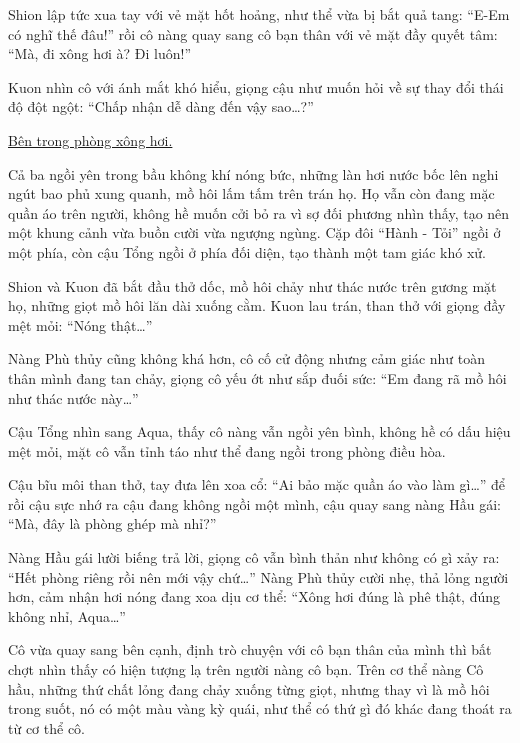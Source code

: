 \documentclass[../main.tex]{subfiles}
\begin{document}
Shion lập tức xua tay với vẻ mặt hốt hoảng, như thể vừa bị bắt quả tang: ``E-Em có nghĩ thế đâu!'' rồi cô nàng quay sang cô bạn thân với vẻ mặt đầy quyết tâm: ``Mà, đi xông hơi à? Đi luôn!''

Kuon nhìn cô với ánh mắt khó hiểu, giọng cậu như muốn hỏi về sự thay đổi thái độ đột ngột: ``Chấp nhận dễ dàng đến vậy sao\dots?''

\begin{center}
  \uline{Bên trong phòng xông hơi.}
\end{center}

Cả ba ngồi yên trong bầu không khí nóng bức, những làn hơi nước bốc lên nghi ngút bao phủ xung quanh, mồ hôi lấm tấm trên trán họ. Họ vẫn còn đang mặc quần áo trên người, không hề muốn cởi bỏ ra vì sợ đối phương nhìn thấy, tạo nên một khung cảnh vừa buồn cười vừa ngượng ngùng. Cặp đôi ``Hành - Tỏi'' ngồi ở một phía, còn cậu Tổng ngồi ở phía đối diện, tạo thành một tam giác khó xử.


Shion và Kuon đã bắt đầu thở dốc, mồ hôi chảy như thác nước trên gương mặt họ, những giọt mồ hôi lăn dài xuống cằm. Kuon lau trán, than thở với giọng đầy mệt mỏi: ``Nóng thật\dots''

Nàng Phù thủy cũng không khá hơn, cô cố cử động nhưng cảm giác như toàn thân mình đang tan chảy, giọng cô yếu ớt như sắp đuối sức: ``Em đang rã mồ hôi như thác nước này\dots''

Cậu Tổng nhìn sang Aqua, thấy cô nàng vẫn ngồi yên bình, không hề có dấu hiệu mệt mỏi, mặt cô vẫn tỉnh táo như thể đang ngồi trong phòng điều hòa.

Cậu bĩu môi than thở, tay đưa lên xoa cổ: ``Ai bảo mặc quần áo vào làm gì\dots'' để rồi cậu sực nhớ ra cậu đang không ngồi một mình, cậu quay sang nàng Hầu gái: ``Mà, đây là phòng ghép mà nhỉ?''

Nàng Hầu gái lười biếng trả lời, giọng cô vẫn bình thản như không có gì xảy ra: ``Hết phòng riêng rồi nên mới vậy chứ\dots'' Nàng Phù thủy cười nhẹ, thả lỏng người hơn, cảm nhận hơi nóng đang xoa dịu cơ thể: ``Xông hơi đúng là phê thật, đúng không nhỉ, Aqua\dots''

Cô vừa quay sang bên cạnh, định trò chuyện với cô bạn thân của mình thì bất chợt nhìn thấy có hiện tượng lạ trên người nàng cô bạn. Trên cơ thể nàng Cô hầu, những thứ chất lỏng đang chảy xuống từng giọt, nhưng thay vì là mồ hôi trong suốt, nó có một màu vàng kỳ quái, như thể có thứ gì đó khác đang thoát ra từ cơ thể cô.
\end{document}
